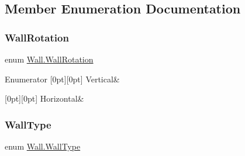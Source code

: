 \subsection{Member Enumeration Documentation}
\mbox{\label{class_wall_a0ff16a0e73bfc8f0d89c5fd6849e3a97}} 
\subsubsection{\texorpdfstring{Wall\+Rotation}{WallRotation}}
{\footnotesize\ttfamily enum \mbox{\hyperlink{class_wall_a0ff16a0e73bfc8f0d89c5fd6849e3a97}{Wall.\+Wall\+Rotation}}\hspace{0.3cm}{\ttfamily [strong]}}

\begin{DoxyEnumFields}{Enumerator}
[0pt][0pt]{}\mbox{\label{class_wall_a0ff16a0e73bfc8f0d89c5fd6849e3a97a06ce2a25e5d12c166a36f654dbea6012}} 
Vertical&\\
\hline

[0pt][0pt]{}\mbox{\label{class_wall_a0ff16a0e73bfc8f0d89c5fd6849e3a97ac1b5fa03ecdb95d4a45dd1c40b02527f}} 
Horizontal&\\
\hline

\end{DoxyEnumFields}
\mbox{\label{class_wall_a1366d94ac70428624a6703d7db89638d}} 
\subsubsection{\texorpdfstring{Wall\+Type}{WallType}}
{\footnotesize\ttfamily enum \mbox{\hyperlink{class_wall_a1366d94ac70428624a6703d7db89638d}{Wall.\+Wall\+Type}}\hspace{0.3cm}{\ttfamily [strong]}}

